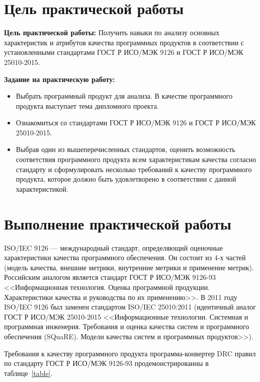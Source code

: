 \section*{\LARGE Цель практической работы}

\textbf{Цель практической работы:}
Получить навыки по анализу основных характеристик и атрибутов
качества программных продуктов в соответствии с установленными
стандартами ГОСТ Р ИСО/МЭК 9126 и ГОСТ Р ИСО/МЭК 25010-2015.

\textbf{Задание на практическую работу:}

\begin{itemize}
	\item Выбрать программный продукт для анализа. В качестве программного
		продукта выступает тема дипломного проекта.
	\item Ознакомиться со стандартами
		ГОСТ Р ИСО/МЭК 9126 и ГОСТ Р ИСО/МЭК 25010-2015.
	\item Выбрав один из вышеперечисленных стандартов, оценить
		возможность соответствия программного продукта всем характеристикам
		качества согласно стандарту и сформулировать несколько требований к
		качеству программного продукта, которое должно быть удовлетворено в
		соответствии с данной характеристикой.
\end{itemize}

\clearpage

\section*{\LARGE Выполнение практической работы}

ISO/IEC 9126 --- международный стандарт, определяющий оценочные
характеристики качества программного обеспечения. Он состоит из 4-х частей
(модель качества, внешние метрики, внутренние метрики и применение
метрик). Российским аналогом является стандарт ГОСТ Р ИСО/МЭК 9126-93
<<Информационная технология. Оценка программной продукции.
Характеристики качества и руководства по их применению>>.
В 2011 году ISO/IEC 9126 был заменен стандартом ISO/IEC 25010:2011
(идентичный аналог ГОСТ Р ИСО/МЭК 25010-2015 <<Информационные
технологии. Системная и программная инженерия. Требования и оценка
качества систем и программного обеспечения (SQuaRE). Модели качества
систем и программных продуктов>>).

Требования к качеству программного продукта
программа-конвертер DRC правил по стандарту ГОСТ Р ИСО/МЭК 9126-93
продемонстрированны в таблице~\ref{table}.

